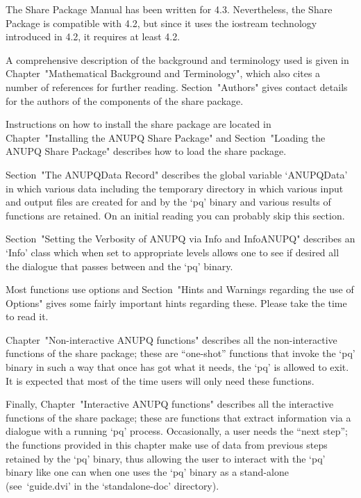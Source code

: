 \endlist


The {\ANUPQ} Share Package  Manual  has  been  written  for  {\GAP}  4.3.
Nevertheless, the {\ANUPQ} Share Package is compatible with  {\GAP}  4.2,
but since it uses the iostream technology introduced in  {\GAP}  4.2,  it
requires at least {\GAP} 4.2.

A comprehensive description of the background  and  terminology  used  is
given in Chapter~"Mathematical Background and  Terminology",  which  also
cites a number of references for further reading. Section~"Authors" gives
contact details for the authors of the components of the  {\ANUPQ}  share
package.

Instructions on how to install the {\ANUPQ} share package are located  in
Chapter~"Installing the ANUPQ Share  Package"  and  Section~"Loading  the
ANUPQ Share Package" describes how to load the {\ANUPQ} share package.

Section~"The ANUPQData Record" describes the global variable  `ANUPQData'
in which various data including the temporary directory in which  various
input and output files are created for and by the `pq' binary and various
results of functions are retained. On an initial reading you can probably
skip this section.

Section~"Setting the Verbosity of ANUPQ via Info and InfoANUPQ" describes
an `Info' class which when set to appropriate levels allows one to see if
desired all the dialogue that passes between {\GAP} and the `pq' binary.

Most {\ANUPQ} functions  use  options  and  Section~"Hints  and  Warnings
regarding the use of Options" gives some fairly important hints regarding
these. Please take the time to read it.

Chapter~"Non-interactive   ANUPQ    functions"    describes    all    the
non-interactive functions  of  the  {\ANUPQ}  share  package;  these  are
``one-shot'' functions that invoke the `pq' binary in  such  a  way  that
once {\GAP} has got what it needs, the `pq' is allowed  to  exit.  It  is
expected that most of the time users will only need these functions.

Finally,  Chapter~"Interactive  ANUPQ  functions"   describes   all   the
interactive functions of the {\ANUPQ} share package; these are  functions
that extract information via a dialogue  with  a  running  `pq'  process.
Occasionally, a user needs the ``next step''; the functions  provided  in
this chapter make use of data from previous steps retained  by  the  `pq'
binary, thus allowing the user to interact with the `pq' binary like  one
can when one uses the `pq' binary as a  stand-alone  (see~`guide.dvi'  in
the `standalone-doc' directory).

